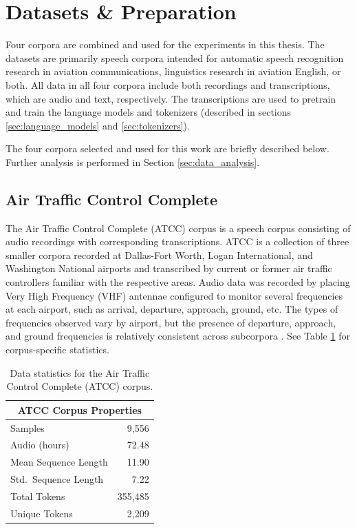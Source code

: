 \documentclass[12pt]{article}
\begin{document}
\section{Datasets \& Preparation}\label{sec:data_source}
Four corpora are combined and used for the experiments in this thesis. The datasets are primarily speech corpora intended for automatic speech
recognition research in aviation communications, linguistics research in aviation English, or both. All data in all four corpora include both
recordings and transcriptions, which are audio and text, respectively. The transcriptions are used to pretrain and train the language models and
tokenizers (described in sections \ref{sec:language_models} and \ref{sec:tokenizers}).

The four corpora selected and used for this work are briefly described below. Further analysis is performed in Section \ref{sec:data_analysis}.

\subsection{Air Traffic Control Complete}\label{sec:atcc}
The Air Traffic Control Complete (ATCC) corpus is a speech corpus consisting of audio recordings with corresponding transcriptions. ATCC is a
collection of three smaller corpora recorded at Dallas-Fort Worth, Logan International, and Washington National airports and transcribed by current or
former air traffic controllers familiar with the respective areas. Audio data was recorded by placing Very High Frequency (VHF) antennae configured to
monitor several frequencies at each airport, such as arrival, departure, approach, ground, etc. The types of frequencies observed vary by airport, but
the presence of departure, approach, and ground frequencies is relatively consistent across subcorpora \cite{godfrey_air_1994}. See Table
\ref{tab:atcc_stats} for corpus-specific statistics.

\begin{table}[!t]
    \centering
    \begin{tabular}{l r}
        \toprule
        \multicolumn{2}{c}{ATCC Corpus Properties} \\
        \midrule
        Samples              & 9,556               \\
        Audio (hours)        & 72.48               \\
        Mean Sequence Length & 11.90               \\
        Std.~Sequence Length & 7.22                \\

        Total Tokens         & 355,485             \\
        Unique Tokens        & 2,209               \\
        \bottomrule
    \end{tabular}
    \caption{Data statistics for the Air Traffic Control Complete (ATCC) corpus.}
    \label{tab:atcc_stats}
\end{table}
\end{document}
